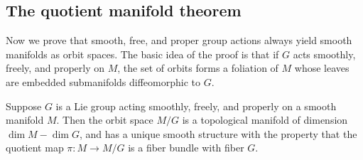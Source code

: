 \subsection{The quotient manifold theorem}
Now we prove that smooth, free, and proper group actions always yield smooth manifolds as orbit spaces. The basic idea of the proof is that if $G$ acts smoothly, freely, 
and properly on $M$, the set of orbits forms a foliation of $M$ whose leaves are embedded submanifolds diffeomorphic to $G$.
\begin{theorem}
Suppose $G$ is a Lie group acting smoothly, freely, and properly on a smooth manifold $M$. Then the orbit space $M/G$ is a topological manifold of dimension $\dim M-\dim G$, and has a unique smooth structure with the property that the quotient map $\pi:M\to M/G$ is a fiber bundle with fiber $G$.
\end{theorem}
